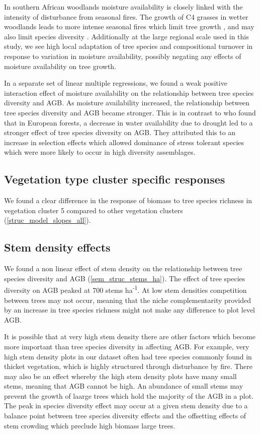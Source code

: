 \documentclass[11pt,a4paper]{article}
\begin{document}
In southern African woodlands moisture availability is closely linked with the intensity of disturbance from seasonal fires. The growth of C4 grasses in wetter woodlands leads to more intense seasonal fires which limit tree growth \citep{Charles-Dominique2018}, and may also limit species diversity \citep{Linder2014}. Additionally at the large regional scale used in this study, we see high local adaptation of tree species and compositional turnover in response to variation in moisture availability, possibly negating any effects of moisture availability on tree growth.

In a separate set of linear multiple regressions, we found a weak positive interaction effect of moisture availability on the relationship between tree species diversity and AGB. As moisture availability increased, the relationship between tree species diversity and AGB became stronger. This is in contrast to \citet{Ratcliffe2017} who found that in European forests, a decrease in water availability due to drought led to a stronger effect of tree species diversity on AGB. They attributed this to an increase in selection effects which allowed dominance of stress tolerant species which were more likely to occur in high diversity assemblages. 

\subsection{Vegetation type cluster specific responses}

We found a clear difference in the response of biomass to tree species richness in vegetation cluster 5 compared to other vegetation clusters (\autoref{struc_model_slopes_all}).



\subsection{Stem density effects}

We found a non linear effect of stem density on the relationship between tree species diversity and AGB (\autoref{sem_struc_stems_ha}). The effect of tree species diversity on AGB peaked at \textapprox{}700 stems ha\textsuperscript{-1}. At low stem densities competition between trees may not occur, meaning that the niche complementarity provided by an increase in tree species richness might not make any difference to plot level AGB.

It is possible that at very high stem density there are other factors which become more important than tree species diversity in affecting AGB. For example, very high stem density plots in our dataset often had tree species commonly found in thicket vegetation, which is highly structured through disturbance by fire. There may also be an effect whereby the high stem density plots have many small stems, meaning that AGB cannot be high. An abundance of small stems may prevent the growth of laarge trees which hold the majority of the AGB in a plot. The peak in species diversity effect may occur at a given stem density due to a balance point between tree species diversity effects and the offsetting effects of stem crowding which preclude high biomass large trees.
\end{document}
